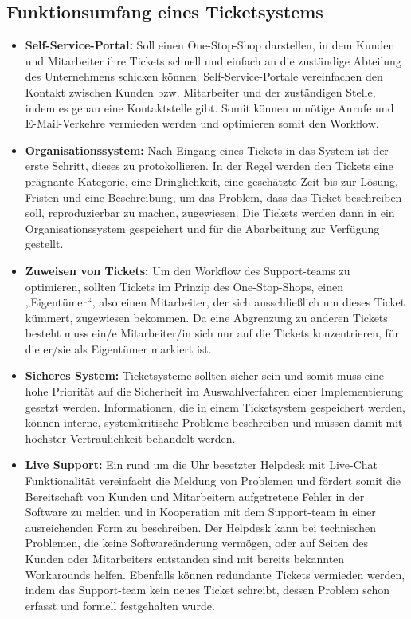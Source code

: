 \subsection{Funktionsumfang eines Ticketsystems}
\begin{itemize}
	\item \textbf{Self-Service-Portal:} Soll einen One-Stop-Shop darstellen, in dem Kunden und Mitarbeiter ihre Tickets schnell und einfach an die zuständige Abteilung des Unternehmens schicken können. Self-Service-Portale vereinfachen den Kontakt zwischen Kunden bzw. Mitarbeiter und der zuständigen Stelle, indem es genau eine Kontaktstelle gibt. Somit können unnötige Anrufe und E-Mail-Verkehre vermieden werden und optimieren somit den Workflow.
	\item \textbf{Organisationssystem:} Nach Eingang eines Tickets in das System ist der erste Schritt, dieses zu protokollieren. In der Regel werden den Tickets eine prägnante Kategorie, eine Dringlichkeit, eine geschätzte Zeit bis zur Lösung, Fristen und eine Beschreibung, um das Problem, dass das Ticket beschreiben soll, reproduzierbar zu machen, zugewiesen. Die Tickets werden dann in ein Organisationssystem gespeichert und für die Abarbeitung zur Verfügung gestellt.
	\item \textbf{Zuweisen von Tickets:} Um den Workflow des Support-teams zu optimieren, sollten Tickets im Prinzip des One-Stop-Shops, einen „Eigentümer“, also einen Mitarbeiter, der sich ausschließlich um dieses Ticket kümmert, zugewiesen bekommen. Da eine Abgrenzung zu anderen Tickets besteht muss ein/e Mitarbeiter/in sich nur auf die Tickets konzentrieren, für die er/sie als Eigentümer markiert ist.
	\item \textbf{Sicheres System:} Ticketsysteme sollten sicher sein und somit muss eine hohe Priorität auf die Sicherheit im Auswahlverfahren einer Implementierung gesetzt werden. Informationen, die in einem Ticketsystem gespeichert werden, können interne, systemkritische Probleme beschreiben und müssen damit mit höchster Vertraulichkeit behandelt werden.
	\item \textbf{Live Support:} Ein rund um die Uhr besetzter Helpdesk mit Live-Chat Funktionalität vereinfacht die Meldung von Problemen und fördert somit die Bereitschaft von Kunden und Mitarbeitern aufgetretene Fehler in der Software zu melden und in Kooperation mit dem Support-team in einer ausreichenden Form zu beschreiben. Der Helpdesk kann bei technischen Problemen, die keine Softwareänderung vermögen, oder auf Seiten des Kunden oder Mitarbeiters entstanden sind mit bereits bekannten Workarounds helfen. Ebenfalls können redundante Tickets vermieden werden, indem das Support-team kein neues Ticket schreibt, dessen Problem schon erfasst und formell festgehalten wurde.
\end{itemize}
